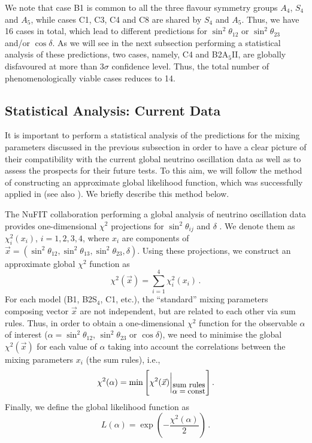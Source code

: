 \documentclass[11pt,a4paper]{article}
\newcommand{\be}{\begin{equation}}
\newcommand{\ee}{\end{equation}}
\def\th{\theta}
\numberwithin{equation}{section}
\begin{document}
 We note that case B1 is common to all the three 
flavour symmetry groups $A_4$, $S_4$ and $A_5$, 
while cases C1, C3, C4 and C8 are shared by $S_4$ and $A_5$.
Thus, we have 16 cases in total, which lead to different predictions for 
$\sin^2\th_{12}$ or $\sin^2\th_{23}$ and/or $\cos\delta$. 
As we will see in the next subsection performing a statistical
analysis of these predictions, two cases, namely, C4 and B2A$_5$II, 
are globally disfavoured at more than $3\sigma$ confidence level.
Thus, the total number of phenomenologically viable cases reduces to 14.


\subsection{Statistical Analysis: Current Data}
\label{subsec:present}

 It is important to perform a statistical analysis 
of the predictions for the mixing parameters discussed in the previous subsection 
in order to have a clear picture of their compatibility with the current global 
neutrino oscillation data as well as to
assess the prospects for their future tests.
To this aim, we will follow the method of constructing 
an approximate global likelihood function, which was successfully applied in 
\cite{Marzocca:2013cr,Girardi:2014faa,Girardi:2015vha}
(see also \cite{Girardi:2015zva}).
We briefly describe this method below.

 The NuFIT collaboration performing a global analysis of neutrino oscillation data
provides one-dimensional $\chi^2$ projections for $\sin^2\th_{ij}$ and $\delta$ \cite{NuFITv32Jan2018}. We denote them as $\chi_i^2(x_i)$, $i=1,2,3,4$, 
where $x_i$ are components of 
$\vec{x} = (\sin^2 \theta_{12},\sin^2 \theta_{13},\sin^2 \theta_{23},\delta)$. 
Using these projections, we construct an approximate global $\chi^2$ function as 
\be
\chi^2(\vec{x}) = \sum_{i=1}^4 \chi_i^2(x_i)\,.
\ee
%
For each model (B1, B2S$_4$, C1, etc.), the ``standard'' mixing parameters 
composing vector $\vec{x}$ are not independent, 
but are related to each other via sum rules. 
Thus, in order to obtain a one-dimensional $\chi^2$ function for 
the observable $\alpha$ of interest
($\alpha = \sin^2\th_{12}$, $\sin^2\th_{23}$ or $\cos\delta$), we need to minimise 
the global $\chi^2(\vec{x})$ for each value of $\alpha$ taking into account 
the correlations between the mixing parameters $x_i$ (the sum rules), i.e., 
\be
\chi^2(\alpha) = \min \Bigg[\chi^2(\vec{x}) 
\bigg|_{\stackon[2pt]{\small $\alpha = \mathrm{const}$}
{\small sum rules}}
\Bigg]\,.
\label{eq:chi2alpha}
\ee
%
Finally, we define the global likelihood function as
\be
L(\alpha) = \exp\left(-\frac{\chi^2(\alpha)}{2}\right)\,.
\label{eq:likelihood}
\ee
\end{document}
